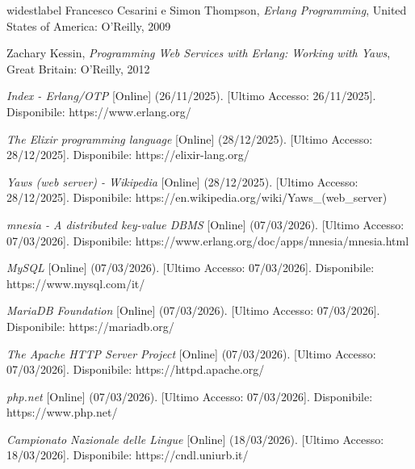 
\begin{thebibliography}{widestlabel}
 	Francesco Cesarini e Simon Thompson,
	\emph{Erlang Programming}, 
	United States of America: O'Reilly, 
	2009	
	
	Zachary Kessin,
	\emph{Programming Web Services with Erlang: Working with Yaws}, 
	Great Britain: O'Reilly, 
	2012	
	
	

	\emph{Index - Erlang/OTP} [Online] (26/11/2025). [Ultimo Accesso: 26/11/2025]. 
	Disponibile: https://www.erlang.org/
	
	\emph{The Elixir programming language} [Online] (28/12/2025). [Ultimo Accesso: 28/12/2025]. 
	Disponibile: https://elixir-lang.org/

	
	
	\emph{Yaws (web server) - Wikipedia} [Online] (28/12/2025). [Ultimo Accesso: 28/12/2025]. 
	Disponibile: https://en.wikipedia.org/wiki/Yaws\_(web\_server)
	
	\emph{mnesia - A distributed key-value DBMS} [Online] (07/03/2026). [Ultimo Accesso: 07/03/2026]. 
	Disponibile: https://www.erlang.org/doc/apps/mnesia/mnesia.html
	
	\emph{MySQL} [Online] (07/03/2026). [Ultimo Accesso: 07/03/2026]. 
	Disponibile: https://www.mysql.com/it/

	\emph{MariaDB Foundation} [Online] (07/03/2026). [Ultimo Accesso: 07/03/2026]. 
	Disponibile: https://mariadb.org/

	\emph{The Apache HTTP Server Project} [Online] (07/03/2026). [Ultimo Accesso: 07/03/2026]. 
	Disponibile: https://httpd.apache.org/
	
	\emph{php.net} [Online] (07/03/2026). [Ultimo Accesso: 07/03/2026]. 
	Disponibile: https://www.php.net/

	\emph{Campionato Nazionale delle Lingue} [Online] (18/03/2026). [Ultimo Accesso: 18/03/2026]. 
	Disponibile: https://cndl.uniurb.it/

	
\end{thebibliography}